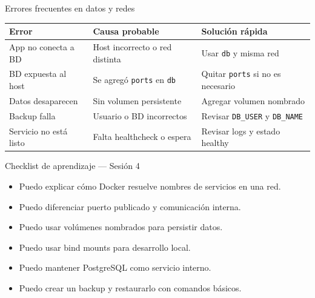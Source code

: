 \documentclass[aspectratio=169]{beamer}
\begin{document}
\begin{frame}{Errores frecuentes en datos y redes}
  \scriptsize
  \begin{tabular}{p{} p{} p{}}
    \toprule
    Error & Causa probable & Solución rápida \\
    \midrule
    App no conecta a BD & Host incorrecto o red distinta & Usar \texttt{db} y misma red \\
    BD expuesta al host & Se agregó \texttt{ports} en \texttt{db} & Quitar \texttt{ports} si no es necesario \\
    Datos desaparecen & Sin volumen persistente & Agregar volumen nombrado \\
    Backup falla & Usuario o BD incorrectos & Revisar \texttt{DB\_USER} y \texttt{DB\_NAME} \\
    Servicio no está listo & Falta healthcheck o espera & Revisar logs y estado healthy \\
    \bottomrule
  \end{tabular}
\end{frame}

\begin{frame}{Checklist de aprendizaje — Sesión 4}
  \begin{itemize}
    \item Puedo explicar cómo Docker resuelve nombres de servicios en una red.
    \item Puedo diferenciar puerto publicado y comunicación interna.
    \item Puedo usar volúmenes nombrados para persistir datos.
    \item Puedo usar bind mounts para desarrollo local.
    \item Puedo mantener PostgreSQL como servicio interno.
    \item Puedo crear un backup y restaurarlo con comandos básicos.
  \end{itemize}
\end{frame}
\end{document}
